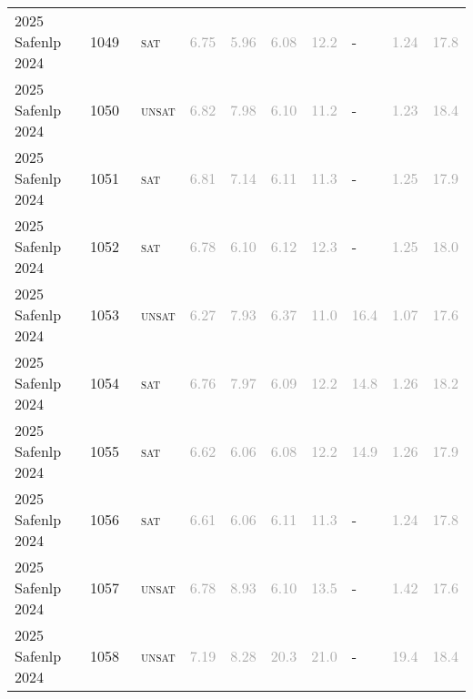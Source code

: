 \begin{center}
{\begin{longtable}{@{}llllllllll@{}}
2025 Safenlp 2024 & 1049 & ~\textsc{sat} & \textcolor{darkgray}{6.75} & \textcolor{darkgray}{5.96} & \textcolor{darkgray}{6.08} & \textcolor{darkgray}{12.2} & - & \textcolor{darkgray}{1.24} & \textcolor{darkgray}{17.8} \\
2025 Safenlp 2024 & 1050 & ~\textsc{unsat} & \textcolor{darkgray}{6.82} & \textcolor{darkgray}{7.98} & \textcolor{darkgray}{6.10} & \textcolor{darkgray}{11.2} & - & \textcolor{darkgray}{1.23} & \textcolor{darkgray}{18.4} \\
2025 Safenlp 2024 & 1051 & ~\textsc{sat} & \textcolor{darkgray}{6.81} & \textcolor{darkgray}{7.14} & \textcolor{darkgray}{6.11} & \textcolor{darkgray}{11.3} & - & \textcolor{darkgray}{1.25} & \textcolor{darkgray}{17.9} \\
2025 Safenlp 2024 & 1052 & ~\textsc{sat} & \textcolor{darkgray}{6.78} & \textcolor{darkgray}{6.10} & \textcolor{darkgray}{6.12} & \textcolor{darkgray}{12.3} & - & \textcolor{darkgray}{1.25} & \textcolor{darkgray}{18.0} \\
2025 Safenlp 2024 & 1053 & ~\textsc{unsat} & \textcolor{darkgray}{6.27} & \textcolor{darkgray}{7.93} & \textcolor{darkgray}{6.37} & \textcolor{darkgray}{11.0} & \textcolor{darkgray}{16.4} & \textcolor{darkgray}{1.07} & \textcolor{darkgray}{17.6} \\
2025 Safenlp 2024 & 1054 & ~\textsc{sat} & \textcolor{darkgray}{6.76} & \textcolor{darkgray}{7.97} & \textcolor{darkgray}{6.09} & \textcolor{darkgray}{12.2} & \textcolor{darkgray}{14.8} & \textcolor{darkgray}{1.26} & \textcolor{darkgray}{18.2} \\
2025 Safenlp 2024 & 1055 & ~\textsc{sat} & \textcolor{darkgray}{6.62} & \textcolor{darkgray}{6.06} & \textcolor{darkgray}{6.08} & \textcolor{darkgray}{12.2} & \textcolor{darkgray}{14.9} & \textcolor{darkgray}{1.26} & \textcolor{darkgray}{17.9} \\
2025 Safenlp 2024 & 1056 & ~\textsc{sat} & \textcolor{darkgray}{6.61} & \textcolor{darkgray}{6.06} & \textcolor{darkgray}{6.11} & \textcolor{darkgray}{11.3} & - & \textcolor{darkgray}{1.24} & \textcolor{darkgray}{17.8} \\
2025 Safenlp 2024 & 1057 & ~\textsc{unsat} & \textcolor{darkgray}{6.78} & \textcolor{darkgray}{8.93} & \textcolor{darkgray}{6.10} & \textcolor{darkgray}{13.5} & - & \textcolor{darkgray}{1.42} & \textcolor{darkgray}{17.6} \\
2025 Safenlp 2024 & 1058 & ~\textsc{unsat} & \textcolor{darkgray}{7.19} & \textcolor{darkgray}{8.28} & \textcolor{darkgray}{20.3} & \textcolor{darkgray}{21.0} & - & \textcolor{darkgray}{19.4} & \textcolor{darkgray}{18.4} \\

\end{longtable}}
\end{center}
